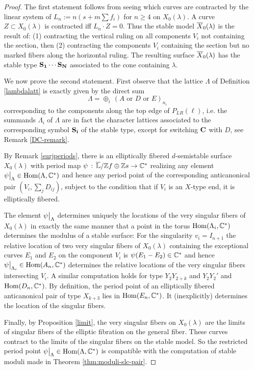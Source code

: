 \documentclass[table,x11names]{amsart}
\begin{document}
  \begin{proof} The first statement
  follows from seeing which curves are contracted by
  the linear system of $L_n:= n(s+m\sum f_i)$ for $n\geq 4$
  on $X_0(\lambda)$. A curve $Z\subset X_0(\lambda)$ is contracted iff
  $L_n\cdot Z=0$. Thus the stable model ${\overline X}_0(\lambda)$ is the result of:
  (1) contracting the vertical ruling on all components $V_i$ not containing the section,
  then (2) contracting the components $V_i$ containing the section but no marked fibers
  along the horizontal ruling. The resulting surface ${\overline X}_0(\lambda)$ has the
  stable type ${\bf S_1\cdots S_N}$ associated to the cone containing $\lambda$.
  
 We now prove the second statement. First observe that the lattice $\Lambda$
  of Definition \ref{lambdalatt} is exactly given by the direct sum
 $$\Lambda = \oplus_i \,(A\textrm{ or }D\textrm{ or }E)_{n_i}$$ corresponding to the components along
 the top edge of $P_{LR}(\ell)$, i.e. the summands $\Lambda_i$
 of $\Lambda$ are in fact the character lattices associated to the corresponding
 symbol ${\bf S_i}$ of the stable type, except for switching ${\bf C}$ with $D$,
 see Remark \ref{DC-remark}.
    
   By Remark \ref{surjperiods}, there is an elliptically
 fibered $d$-semistable surface $X_0(\lambda)$
 with period map $\psi\,:\,\overline{\mathbb{L}}/ \mathbb{Z} f\oplus \mathbb{Z} s \to \mathbb{C}^*$ realizing
 any element $\psi\big{|}_{\Lambda}\in \operatorname{Hom}(\Lambda,\mathbb{C}^*)$ and hence any period
 point of the corresponding anticanonical pair $(V_i,\sum_j D_{ij})$,
subject to the condition that if $V_i$ is an $X$-type end, it is elliptically fibered.
 
 The element $\psi\big{|}_\Lambda$ determines uniquely the locations of the very
 singular fibers of $X_0(\lambda)$ in exactly the same manner that a point in the
 torus $\operatorname{Hom}(\Lambda_i,\mathbb{C}^*)$ determines the modulus of a stable surface:
 For the singularity $v_i= I_{n+1}$
 the relative location of two
 very singular fibers of $X_0(\lambda)$ containing the exceptional curves
 $E_1$ and $E_2$
 on the component $V_i$ is
$\psi(E_1-E_2)\in \mathbb{C}^*$ and hence $\psi\big{|}_{\Lambda_i}\in \operatorname{Hom}(A_n,\mathbb{C}^*)$
determines the relative locations of the very singular fibers intersecting $V_i$.
A similar computation
holds for type $Y_2Y_{2+k}$ and $Y_2Y_2'$ and $\operatorname{Hom}(D_n,\mathbb{C}^*)$.
By definition, the period point of an
elliptically fibered anticanonical pair of type 
$X_{k+3}$ lies in $\operatorname{Hom}(E_n,\mathbb{C}^*)$. It (inexplicitly) determines the location
of the singular fibers.

Finally, by Proposition \ref{limit}, the very singular fibers on $X_0(\lambda)$
are the limits of singular fibers
of the elliptic fibration on the general fiber. These curves contract to
the limits of the singular fibers on the stable model. So
 the restricted period point $\psi\big{|}_\Lambda\in \operatorname{Hom}(\Lambda,\mathbb{C}^*)$
 is compatible with the computation of stable moduli
made in Theorem \ref{thm:moduli-slc-pair}.\end{proof}
\end{document}
